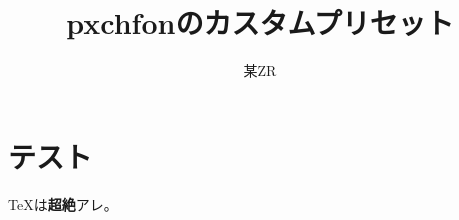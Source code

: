 \documentclass[a4paper]{jsarticle}
\title{pxchfonのカスタムプリセット}
\author{某ZR}
\begin{document}
\maketitle
\section{テスト}
{\TeX}は\textbf{超絶}アレ。%
\end{document}
